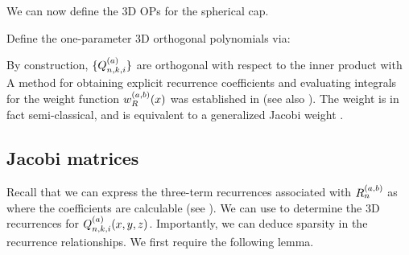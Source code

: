 We can now define the 3D OPs for the spherical cap.
\begin{definition}\label{def:sc:OPconstruction}
	Define the one-parameter 3D orthogonal polynomials via:
\end{definition}

By construction, $\{Q_{n,k,i}^{(a)}\}$ are orthogonal with respect to the inner product 
with 
A method for obtaining explicit recurrence coefficients and evaluating integrals for the weight function $w_R^{(a,b)}(x)$ was established in  (see also \cite{snowball2019sparse}). The weight is in fact semi-classical, and is equivalent to a generalized Jacobi weight \cite[\S5]{magnus1995painleve}.


\subsection{Jacobi matrices}\label{section:sc:jacobimats}

Recall that we can express the three-term recurrences associated with $R_n^{(a,b)}$ as
where the coefficients are calculable (see ). We can use  to determine the 3D recurrences for $Q_{n,k,i}^{(a)}(x,y,z)$. Importantly, we can deduce sparsity in the recurrence relationships.  We first require the following lemma.

